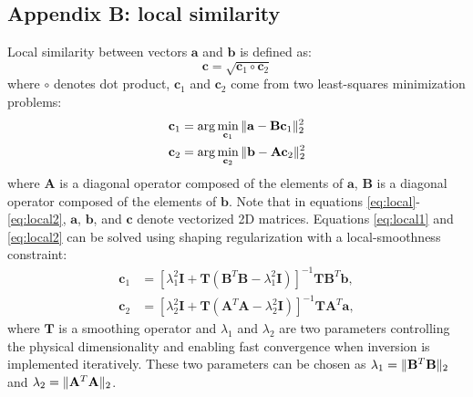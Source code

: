 \subsection{Appendix B: local similarity}
Local similarity between vectors $\mathbf{a}$ and $\mathbf{b}$ is defined as:
\begin{equation}
\label{eq:local}
\mathbf{c}=\sqrt{\mathbf{c}_1\circ\mathbf{c}_2}
\end{equation}
where $\circ$ denotes dot product, $\mathbf{c}_1$ and $\mathbf{c}_2$ come from two least-squares minimization problems:
\begin{align}
\label{eq:local1}
\mathbf{c}_1 &=\arg\min_{\mathbf{c}_1}\Arrowvert \mathbf{a}-\mathbf{B} \mathbf{c}_1 \Arrowvert_2^2 \\
\label{eq:local2}
\mathbf{c}_2 &=\arg\min_{\mathbf{c}_2}\Arrowvert \mathbf{b}-\mathbf{A} \mathbf{c}_2 \Arrowvert_2^2
\end{align}
where $\mathbf{A}$ is a diagonal operator composed of the elements of $\mathbf{a}$, $\mathbf{B}$ is a diagonal operator composed of the elements of $\mathbf{b}$. Note that in equations \ref{eq:local}-\ref{eq:local2}, $\mathbf{a}$, $\mathbf{b}$, and $\mathbf{c}$  denote vectorized 2D matrices. Equations \ref{eq:local1} and \ref{eq:local2} can be solved using shaping regularization with a local-smoothness constraint:
\begin{align}
\label{eq:local3}
\mathbf{c}_1 &= [\lambda_1^2\mathbf{I} + \mathbf{T}(\mathbf{B}^T\mathbf{B}-\lambda_1^2\mathbf{I})]^{-1}\mathbf{TB}^T\mathbf{b},\\
\label{eq:local4}
\mathbf{c}_2 &= [\lambda_2^2\mathbf{I} + \mathbf{T}(\mathbf{A}^T\mathbf{A}-\lambda_2^2\mathbf{I})]^{-1}\mathbf{TA}^T\mathbf{a},
\end{align}
where $\mathbf{T}$ is a smoothing operator and $\lambda_1$ and $\lambda_2$ are two parameters controlling the physical dimensionality and enabling fast convergence when inversion is implemented iteratively. These two parameters can be chosen as $\lambda_1  = \Arrowvert\mathbf{B}^T\mathbf{B}\Arrowvert_2$ and $\lambda_2  = \Arrowvert\mathbf{A}^T\mathbf{A}\Arrowvert_2$.





\newpage
\listoffigures

